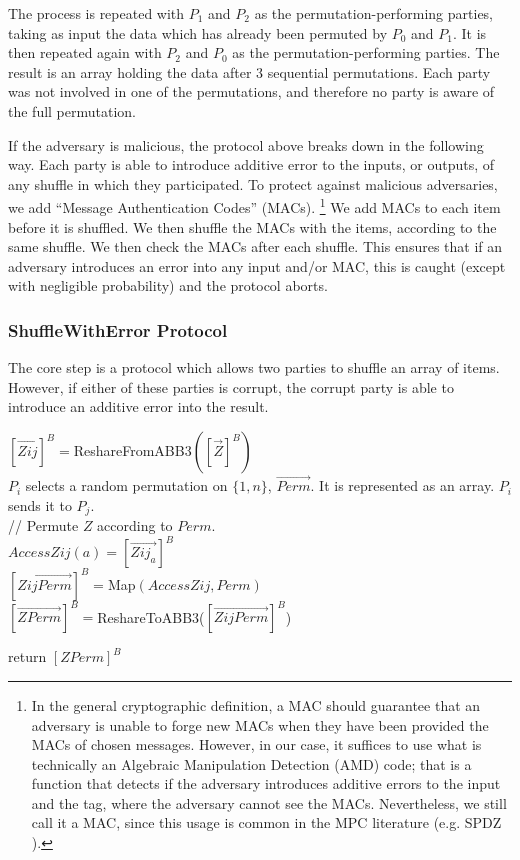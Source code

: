 The process is repeated with $P_1$ and $P_2$ as the permutation-performing parties,
taking as input the data which has already been permuted by $P_0$ and $P_1$.
It is then repeated again with $P_2$ and $P_0$ as the permutation-performing parties.
The result is an array holding the data after 3 sequential permutations.
Each party was not involved in one of the permutations, and therefore no party
is aware of the full permutation.

If the adversary is malicious, the protocol above breaks down in the following way.
Each party is able to introduce additive error to the inputs, or outputs, of any shuffle
in which they participated.
To protect against malicious adversaries, we add ``Message Authentication Codes'' (MACs).%
\footnote{
	In the general cryptographic definition, a MAC should guarantee that an 
	adversary is unable to forge new MACs when they have been provided the MACs
	of chosen messages.
	However, in our case, it suffices to use what is technically 
	an Algebraic Manipulation Detection (AMD) code;
	that is a function that detects if the adversary introduces additive errors to the
	input and the tag, where the adversary cannot see the MACs.
	Nevertheless, we still call it a MAC, since this usage is common in the MPC 
	literature (e.g. SPDZ \cite{C:DPSZ12}).
}
We add MACs to each item before it is shuffled.
We then shuffle the MACs with the items, according to the same shuffle.
We then check the MACs after each shuffle. 
This ensures that if an adversary introduces an error into any input
and/or MAC, this is caught (except with negligible probability)
and the protocol aborts.

\subsubsection{ShuffleWithError Protocol}

The core step is a protocol which allows two parties to shuffle 
an array of items.
However, if either of these parties is corrupt, the corrupt party
is able to introduce an additive error into the result.

\begin{protocol}[2PartyShuffleWithError$({P_i, P_j, [\vec{Z}]^B})$]
	\begin{protocol}
		$[\vec{Zij}]^B = $ReshareFromABB3$([\vec{Z}]^B)$\\
		$P_i$ selects a random permutation on $\{1, n\}$, $\vec{Perm}$.
		It is represented as an array. $P_i$ sends it to $P_j$.\\
		\noindent // Permute $Z$ according to $Perm$.\\
		$AccessZij(a) = [\vec{Zij_a}]^B$\\
		$[\vec{ZijPerm}]^B = $Map$(AccessZij, Perm)$\\
		$[\vec{ZPerm}]^B = $ReshareToABB3($[\vec{ZijPerm}]^B$)
	\end{protocol}
	return $[ZPerm]^B$ \\
\end{protocol}

